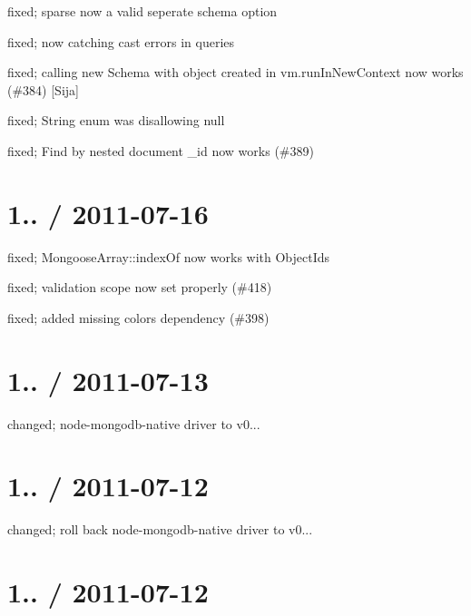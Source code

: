 \begin{DoxyItemize}
\item fixed; sparse now a valid seperate schema option
\item fixed; now catching cast errors in queries
\item fixed; calling new Schema with object created in vm.\+run\+In\+New\+Context now works (\#384) \mbox{[}Sija\mbox{]}
\item fixed; String enum was disallowing null
\item fixed; Find by nested document \+\_\+id now works (\#389)
\end{DoxyItemize}

\section*{1.. / 2011-\/07-\/16 }


\begin{DoxyItemize}
\item fixed; Mongoose\+Array\+::index\+Of now works with Object\+Ids
\item fixed; validation scope now set properly (\#418)
\item fixed; added missing colors dependency (\#398)
\end{DoxyItemize}

\section*{1.. / 2011-\/07-\/13 }


\begin{DoxyItemize}
\item changed; node-\/mongodb-\/native driver to v0...
\end{DoxyItemize}

\section*{1.. / 2011-\/07-\/12 }


\begin{DoxyItemize}
\item changed; roll back node-\/mongodb-\/native driver to v0...
\end{DoxyItemize}

\section*{1.. / 2011-\/07-\/12 }


